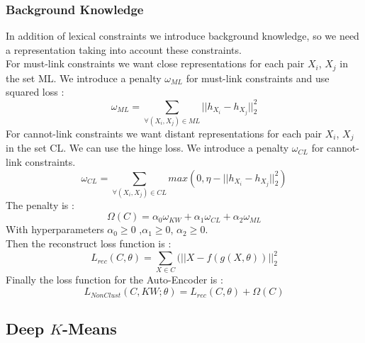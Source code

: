 \subsubsection{Background Knowledge}
In addition of lexical constraints we introduce background knowledge, so we need
a representation taking into account these constraints.\\
For must-link constraints we want close representations for each pair $X_i$, $X_j$
in the set ML. We introduce a penalty $\omega_{ML}$ for must-link
constraints and use squared loss :
\begin{equation}\label{eq:omegaML}
  \omega_{ML} = \sum_{\forall{(X_i,X_j)\in ML}} || h_{X_i} - h_{X_j} ||_2^2
\end{equation}
For cannot-link constraints we want distant representations for each pair $X_i$,
$X_j$ in the set CL.
We can use the hinge loss.
We introduce a penalty $\omega_{CL}$ for cannot-link constraints.
\begin{equation}\label{eq:omegaCL}
  \omega_{CL} = \sum_{\forall{(X_i,X_j)\in CL}} max(0,
  \eta - || h_{X_i} - h_{X_j} ||_2^2)
\end{equation}
The penalty is :
\begin{equation}\label{eq:Sparse}
  \Omega(C) = \alpha_0\omega_{KW} + \alpha_1\omega_{CL} + \alpha_2\omega_{ML}  
\end{equation}
With hyperparameters $\alpha_0\geq 0$ ,$\alpha_1\geq 0$, $\alpha_2\geq 0$.
\\Then the reconstruct loss function is :
\begin{equation}\label{eq:AEDK}
  L_{rec}(C, \theta) = \sum_{X \in C}(||X - f(g(X, \theta))||_2^2
\end{equation}
Finally the loss function for the Auto-Encoder is :
\begin{equation}\label{eq:AE}
  L_{NonClust}(C,KW; \theta) = L_{rec}(C, \theta) + \Omega(C)  
\end{equation}

\subsection{Deep $K$-Means}

